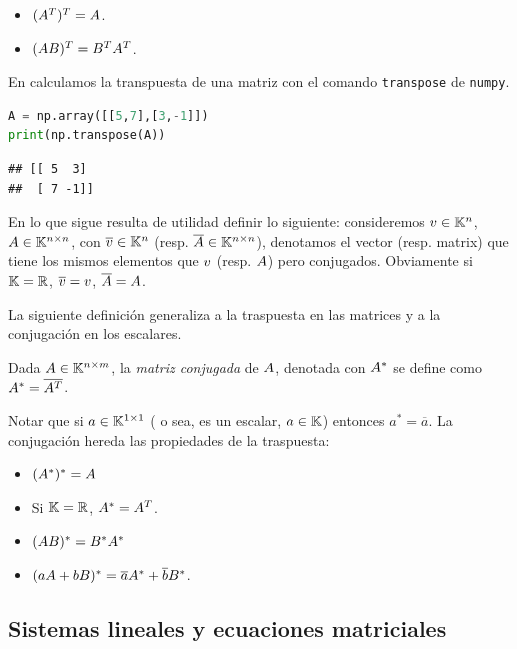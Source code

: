 \begin{proposicion}\leavevmode
\begin{itemize}
\item $(\Ab^T)^T = \Ab$.
\item $(\Ab \Bb)^T = \Bb^T \Ab^T$.
\end{itemize}
\end{proposicion}

En \python calculamos la transpuesta de una matriz con el comando \texttt{transpose} de \texttt{numpy}.

\begin{Shaded}
\begin{lstlisting}[language=Python]
A = np.array([[5,7],[3,-1]])
print(np.transpose(A))
\end{lstlisting}
\end{Shaded}

\begin{verbatim}
## [[ 5  3]
##  [ 7 -1]]
\end{verbatim}

En lo que sigue resulta de utilidad definir lo siguiente: consideremos $\vb\in \Kn$, $\Ab\in \Knn$, con $\overline{\vb}\in \Kn$ (resp. $\overline{\Ab}\in \Knn$), denotamos el vector (resp. matrix) que tiene los mismos elementos que $\vb$ (resp. $\Ab$) pero conjugados. Obviamente si $\mathbb K=\mathbb R$, $\overline{\vb}=\vb$,  $\overline{\Ab}=\Ab$.

La siguiente definición generaliza a la traspuesta en las matrices y a la conjugación en los escalares.

Dada $\Ab\in \K^{n\times m}$, la \emph{matriz conjugada} de $\Ab$, denotada con $\Ab^*$
 se define como $\Ab^*=\overline{\Ab^T}$.

Notar que si $a\in \mathbb K^{1\times 1}$ ( o sea, es un escalar, $a\in \mathbb K$) entonces $a^*=\overline{a}$. La conjugación hereda las propiedades de la traspuesta:
\begin{itemize}
 \item $(\Ab^*)^*=\Ab$
 \item Si $\mathbb K=\mathbb R$, $\Ab^*=\Ab^T$.
 \item $(\Ab\Bb)^*=\Bb^*\Ab^*$
 \item $(a\Ab+b\Bb)^*=\overline{a}\Ab^*+ \overline{b}\Bb^*$.
\end{itemize}




\subsection{Sistemas lineales y ecuaciones matriciales}

